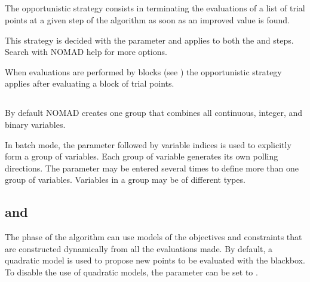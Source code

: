 \documentclass[letterpaper,10pt,english]{sphinxmanual}
\begin{document}
\subsection{}
\label{\detokenize{AdvancedFunctionalities:eval-opportunistic}}\label{\detokenize{AdvancedFunctionalities:id5}}
\sphinxAtStartPar
The opportunistic strategy consists in terminating the evaluations of a list of trial points at a given step of the algorithm as soon as an improved value is found.

\sphinxAtStartPar
This strategy is decided with the parameter  and applies to both the  and  steps.
Search with NOMAD help  for more options.

\sphinxAtStartPar
When evaluations are performed by blocks (see {\hyperref[\detokenize{AdvancedFunctionalities:block-evaluations}]{}}) the opportunistic strategy applies after evaluating a block of trial points.


\subsection{}
\label{\detokenize{AdvancedFunctionalities:variable-group}}\label{\detokenize{AdvancedFunctionalities:id6}}
\sphinxAtStartPar
By default NOMAD creates one group that combines all continuous, integer, and binary variables.

\sphinxAtStartPar
In batch mode, the  parameter followed by variable indices is used to explicitly form a group of variables.
Each group of variable generates its own polling directions. The parameter may be entered several times to define more than one group of variables.
Variables in a group may be of different types.


\subsection{ and }
\label{\detokenize{AdvancedFunctionalities:quad-model-search-and-sgtelib-model-search}}\label{\detokenize{AdvancedFunctionalities:quad-model-search}}
\sphinxAtStartPar
The  phase of the  algorithm can use models of the objectives and constraints that are constructed dynamically from all the evaluations made.
By default, a quadratic model is used to propose new points to be evaluated with the blackbox.
To disable the use of quadratic models, the parameter  can be set to .
\end{document}
